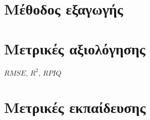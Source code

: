 \section{Μέθοδος εξαγωγής }

\subsection{}


\section{Μετρικές αξιολόγησης}
$RMSE$, ${R^2}$, $RPIQ$ 

\section{Μετρικές εκπαίδευσης}
